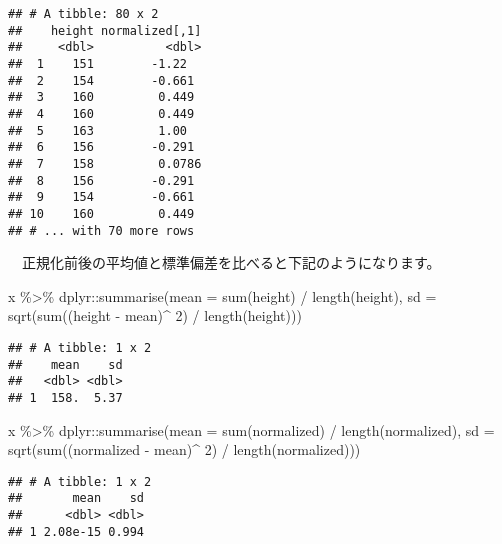 \documentclass[
  12pt,
]{book}
\newenvironment{Shaded}{\begin{snugshade}}{\end{snugshade}}
\newcommand{\AttributeTok}[1]{\textcolor[rgb]{0.77,0.63,0.00}{#1}}
\newcommand{\DecValTok}[1]{\textcolor[rgb]{0.00,0.00,0.81}{#1}}
\newcommand{\FunctionTok}[1]{\textcolor[rgb]{0.00,0.00,0.00}{#1}}
\newcommand{\NormalTok}[1]{#1}
\newcommand{\SpecialCharTok}[1]{\textcolor[rgb]{0.00,0.00,0.00}{#1}}
\begin{document}
\begin{verbatim}
## # A tibble: 80 x 2
##    height normalized[,1]
##     <dbl>          <dbl>
##  1    151        -1.22  
##  2    154        -0.661 
##  3    160         0.449 
##  4    160         0.449 
##  5    163         1.00  
##  6    156        -0.291 
##  7    158         0.0786
##  8    156        -0.291 
##  9    154        -0.661 
## 10    160         0.449 
## # ... with 70 more rows
\end{verbatim}

　正規化前後の平均値と標準偏差を比べると下記のようになります。

\begin{Shaded}
\begin{Highlighting}[]
\NormalTok{x }\SpecialCharTok{\%\textgreater{}\%} 
\NormalTok{  dplyr}\SpecialCharTok{::}\FunctionTok{summarise}\NormalTok{(}\AttributeTok{mean =} \FunctionTok{sum}\NormalTok{(height) }\SpecialCharTok{/} \FunctionTok{length}\NormalTok{(height),}
                   \AttributeTok{sd =} \FunctionTok{sqrt}\NormalTok{(}\FunctionTok{sum}\NormalTok{((height }\SpecialCharTok{{-}}\NormalTok{ mean)}\SpecialCharTok{\^{}} \DecValTok{2}\NormalTok{) }\SpecialCharTok{/} \FunctionTok{length}\NormalTok{(height)))}
\end{Highlighting}
\end{Shaded}

\begin{verbatim}
## # A tibble: 1 x 2
##    mean    sd
##   <dbl> <dbl>
## 1  158.  5.37
\end{verbatim}

\begin{Shaded}
\begin{Highlighting}[]
\NormalTok{x }\SpecialCharTok{\%\textgreater{}\%} 
\NormalTok{  dplyr}\SpecialCharTok{::}\FunctionTok{summarise}\NormalTok{(}\AttributeTok{mean =} \FunctionTok{sum}\NormalTok{(normalized) }\SpecialCharTok{/} \FunctionTok{length}\NormalTok{(normalized),}
                   \AttributeTok{sd =} \FunctionTok{sqrt}\NormalTok{(}\FunctionTok{sum}\NormalTok{((normalized }\SpecialCharTok{{-}}\NormalTok{ mean)}\SpecialCharTok{\^{}} \DecValTok{2}\NormalTok{) }\SpecialCharTok{/} \FunctionTok{length}\NormalTok{(normalized)))}
\end{Highlighting}
\end{Shaded}

\begin{verbatim}
## # A tibble: 1 x 2
##       mean    sd
##      <dbl> <dbl>
## 1 2.08e-15 0.994
\end{verbatim}
\end{document}
